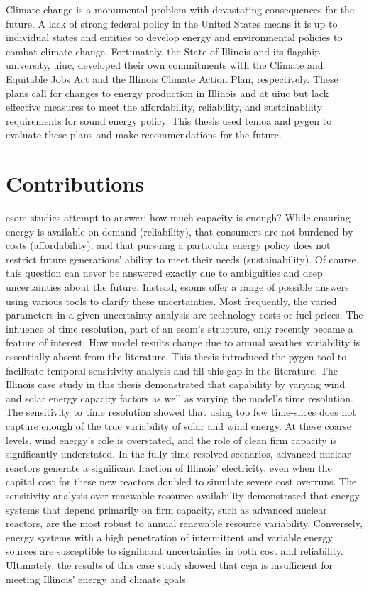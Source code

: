 Climate change is a monumental problem with devastating consequences for the future.
A lack of strong federal policy in the United States means it is up to individual
states and entities to develop energy and environmental policies to combat climate
change. Fortunately, the State of Illinois and its flagship university, \gls{uiuc},
developed their own commitments with the Climate and Equitable Jobs Act and
the Illinois Climate Action Plan, respectively. These plans call for changes
to energy production in Illinois and at \gls{uiuc} but lack effective measures
to meet the affordability, reliability, and sustainability requirements for sound
energy policy. This thesis used \gls{temoa} and \gls{pygen} to evaluate these
plans and make recommendations for the future.

\section{Contributions}

\gls{esom} studies attempt to answer: how much capacity is enough? While
ensuring energy is available on-demand (reliability), that consumers are not
burdened by costs (affordability), and that pursuing a particular energy policy
does not restrict future generations' ability to meet their needs (sustainability).
Of course, this question can never be answered exactly due to ambiguities and deep
uncertainties about the future. Instead, \glspl{esom} offer a range of possible answers
using various tools to clarify these uncertainties. Most frequently, the varied
parameters in a given uncertainty analysis are technology
costs or fuel prices. The influence of time resolution, part of an \gls{esom}'s
structure, only recently became a feature of interest. How model results change
due to annual weather variability is essentially absent from the literature.
This thesis introduced the \gls{pygen} tool to facilitate temporal sensitivity
analysis and fill this gap in the literature. The Illinois case study in this thesis
demonstrated that capability by varying wind and solar energy capacity factors
as well as varying the model's time resolution. The sensitivity to time resolution
showed that using too few time-slices does not capture enough of the true variability
of solar and wind energy. At these coarse levels, wind energy's role is overstated,
and the role of clean firm capacity is significantly understated. In the fully
time-resolved scenarios, advanced nuclear reactors generate a significant fraction
of Illinois' electricity, even when the capital cost for these new reactors doubled
to simulate severe cost overruns. The sensitivity analysis over renewable resource
availability demonstrated that energy systems that depend primarily on firm
capacity, such as advanced nuclear reactors, are the most robust to annual renewable
resource variability. Conversely, energy systems with a high penetration of intermittent
and variable energy sources are susceptible to significant uncertainties in both cost
and reliability. Ultimately, the results of this case study showed that \gls{ceja}
is insufficient for meeting Illinois' energy and climate goals.

